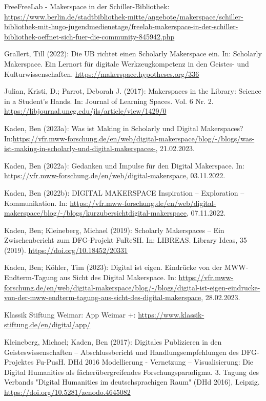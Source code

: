 \documentclass[a4paper,
fontsize=11pt,
oneside,
numbers=noperiodatend,
parskip=half-,
bibliography=totoc,
final
]{scrartcl}
\begin{document}
FreeFreeLab - Makerspace in der Schiller-Bibliothek:
\url{https://www.berlin.de/stadtbibliothek-mitte/angebote/makerspace/schiller-bibliothek-mit-hugo-jugendmedienetage/freelab-makerspace-in-der-schiller-bibliothek-oeffnet-sich-fuer-die-community-845942.php}

Grallert, Till (2022): Die UB richtet einen Scholarly Makerspace ein.
In: Scholarly Makerspace. Ein Lernort für digitale Werkzeugkompetenz in
den Geistes- und Kulturwissenschaften.
\url{https://makerspace.hypotheses.org/336}

Julian, Kristi, D.; Parrot, Deborah J. (2017): Makerspaces in the
Library: Science in a Student's Hands. In: Journal of Learning Spaces.
Vol. 6 Nr. 2. \url{https://libjournal.uncg.edu/jls/article/view/1429/0}

Kaden, Ben (2023a): Was ist Making in Scholarly und Digital Makerspaces?
In:\url{https://vfr.mww-forschung.de/en/web/digital-makerspace/blog/-/blogs/was-ist-making-in-scholarly-und-digital-makerspaces-},
21.02.2023.

Kaden, Ben (2022a): Gedanken und Impulse für den Digital Makerspace. In:
\url{https://vfr.mww-forschung.de/en/web/digital-makerspace},
03.11.2022.

Kaden, Ben (2022b): DIGITAL MAKERSPACE Inspiration -- Exploration --
Kommunikation. In:
\url{https://vfr.mww-forschung.de/en/web/digital-makerspace/blog/-/blogs/kurzubersichtdigital-makerspace},
07.11.2022.

Kaden, Ben; Kleineberg, Michael (2019): Scholarly Makerspaces -- Ein
Zwischenbericht zum DFG-Projekt FuReSH. In: LIBREAS. Library Ideas, 35
(2019). \url{https://doi.org/10.18452/20331}

Kaden, Ben; Köhler, Tim (2023): Digital ist eigen. Eindrücke von der
MWW-Endterm-Tagung aus Sicht des Digital Makerspace. In:
\url{https://vfr.mww-forschung.de/en/web/digital-makerspace/blog/-/blogs/digital-ist-eigen-eindrucke-von-der-mww-endterm-tagung-aus-sicht-des-digital-makerspace},
28.02.2023.

Klassik Stiftung Weimar: App Weimar +:
\url{https://www.klassik-stiftung.de/en/digital/app/}

Kleineberg, Michael; Kaden, Ben (2017): Digitales Publizieren in den
Geisteswissenschaften -- Abschlussbericht und Handlungsempfehlungen des
DFG-Projektes Fu-PusH. DHd 2016 Modellierung - Vernetzung --
Visualisierung: Die Digital Humanities als fächerübergreifendes
Forschungsparadigma. 3. Tagung des Verbands "Digital Humanities im
deutschsprachigen Raum" (DHd 2016), Leipzig.
\url{https://doi.org/10.5281/zenodo.4645082}
\end{document}
